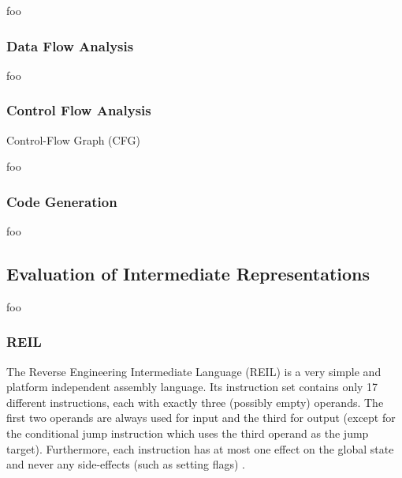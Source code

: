 foo


\subsubsection{Data Flow Analysis}

foo

\cite{type_decomp}


\subsubsection{Control Flow Analysis}

Control-Flow Graph (CFG)

foo


\subsubsection{Code Generation}

foo


\subsection{Evaluation of Intermediate Representations}



foo


\subsubsection{REIL}

The Reverse Engineering Intermediate Language (REIL) is a very simple and platform independent assembly language. Its instruction set contains only 17 different instructions, each with exactly three (possibly empty) operands. The first two operands are always used for input and the third for output (except for the conditional jump instruction which uses the third operand as the jump target). Furthermore, each instruction has at most one effect on the global state and never any side-effects (such as setting flags) \cite{reil,reil_spec}.

